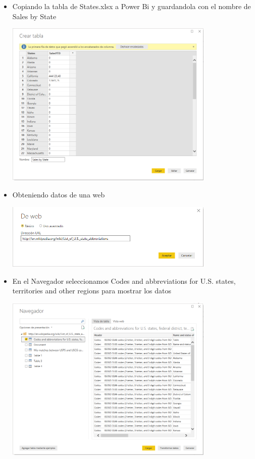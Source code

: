 \begin{itemize}
	\item  Copiando la tabla de States.xlsx a Power Bi y guardandola con el nombre de Sales by State
	\begin{center}
	\includegraphics[width=10cm]{./Imagenes/Captura3-1} 
	\end{center}
\end{itemize} 
\begin{itemize}
	\item Obteniendo datos de una web
	\begin{center}
	\includegraphics[width=10cm]{./Imagenes/Captura3-2} 
	\end{center}
\end{itemize} 
\begin{itemize}
	\item En el Navegador seleccionamos Codes and abbreviations for U.S. states, territories and other regions para mostrar los datos
	\begin{center}
	\includegraphics[width=10cm]{./Imagenes/Captura3-3} 
	\end{center}
\end{itemize} 
